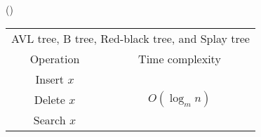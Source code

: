 \item \begin{theorem}{()}
    \begin{table}[H]
        \centering
        \begin{tabular}{|c|c|}
            \hline
            \multicolumn{2}{|c|}{AVL tree, B tree, Red-black tree, and Splay tree} \\
            \Xhline{3\arrayrulewidth}
            Operation & Time complexity \\
            \Xhline{2\arrayrulewidth}
            Insert $x$ & \multirow{3}{*}{$O(\log_m n)$} \\
            \cline{1-1}
            Delete $x$ & \\
            \cline{1-1}
            Search $x$ & \\
            \hline
        \end{tabular}
    \end{table}
\end{theorem}

